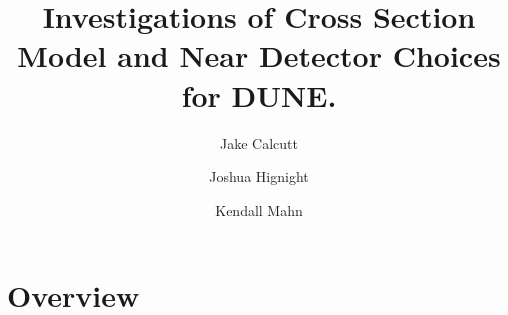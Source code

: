 \documentclass[12pt]{article}
\title{Investigations of Cross Section Model and Near Detector Choices for DUNE.}
\date{}
\begin{document}
\author[1]{Jake Calcutt}
\author[1]{Joshua Hignight}
\author[1]{Kendall Mahn}


\maketitle
\thispagestyle{fancy}

\section{Overview}\label{sec:view}

\end{document}
